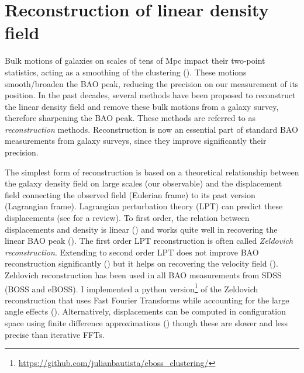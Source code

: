 \section{Reconstruction of linear density field} 
\label{galaxies:reconstruction}

Bulk motions of galaxies on scales of tens of Mpc impact their two-point statistics, 
acting as a smoothing of the clustering (\cite{eisensteinRobustnessAcousticScale2007}).  
These motions smooth/broaden the BAO peak, reducing the precision on our measurement of its position. 
In the past decades, several methods have been proposed to reconstruct
the linear density field and remove these bulk motions from a galaxy survey,
therefore sharpening the BAO peak.
These methods are referred to as \emph{reconstruction} methods. 
Reconstruction is now an essential part of standard BAO measurements from galaxy surveys,
since they improve significantly their precision. 

The simplest form of reconstruction is based on a theoretical relationship between 
the galaxy density field on large scales (our observable) and the displacement field connecting 
the observed field (Eulerian frame) to its past version (Lagrangian frame). 
Lagrangian perturbation theory (LPT) can predict these displacements 
(see \cite{bernardeauLargeScaleStructureUniverse2002} for a review). 
To first order, the relation between displacements and density is linear 
(\cite{zeldovichGravitationalInstabilityApproximate1970}) and works quite well in 
recovering the linear BAO peak 
(\cite{nusserTracingLargeScaleFluctuations1992, eisensteinImprovingCosmologicalDistance2007}).
The first order LPT reconstruction is often called \emph{Zeldovich reconstruction}. 
Extending to second order LPT does not improve BAO reconstruction significantly 
(\cite{seoHighprecisionPredictionsAcoustic2010}) but it helps on recovering the 
velocity field (\cite{kitauraEstimatingCosmicVelocity2012}).
Zeldovich reconstruction has been used in all BAO measurements from SDSS (BOSS and eBOSS).
I implemented a python version\footnote{\url{https://github.com/julianbautista/eboss_clustering/}} of 
the Zeldovich reconstruction that uses Fast Fourier Transforms while accounting for the 
large angle effects 
(\cite{burdenEfficientReconstructionLinear2014, burdenReconstructionFourierSpace2015}). 
Alternatively, displacements can be computed 
in configuration space using finite difference approximations (\cite{padmanabhanCentDistance352012})
though these are slower and less precise than iterative FFTs. 

